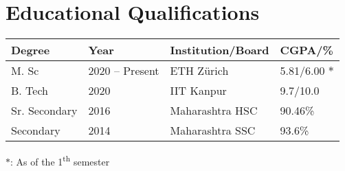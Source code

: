 \setlength\extrarowheight{3pt}  %

\section*{Educational Qualifications}
\begin{tabulary}{\textwidth}{L L L L}

\toprule
\textbf{Degree} & \textbf{Year} & \textbf{Institution/Board} & \textbf{CGPA/\%}\\
\midrule
M. Sc & 2020 -- Present & ETH Zürich & 5.81/6.00 $\ast$ \\%
B. Tech & 2020 & IIT Kanpur & 9.7/10.0\\
Sr. Secondary & 2016 & Maharashtra HSC & 90.46\%\\
Secondary & 2014 & Maharashtra SSC & 93.6\%\\
\bottomrule

\end{tabulary}

\vspace{2mm}
{\small $\ast$: As of the 1\textsuperscript{th} semester}
